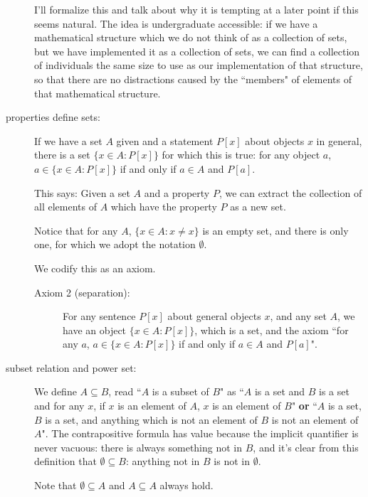 \documentclass[12pt]{article}
\begin{document}
\begin{description}
\begin{description}
\end{description}

I'll formalize this and talk about why it is tempting at a later point if this seems natural.  The idea is undergraduate accessible:  if we have a mathematical structure which we do not think of as a collection of sets, but we have implemented it as a collection of sets, we can find a collection of individuals the same size to use as our implementation of that structure, so that there are no distractions caused by the ``members" of elements of that mathematical structure.

\item[properties define sets:]  If we have a set $A$ given and a statement $P[x]$ about objects  $x$ in general, there is a set
$\{x \in A:P[x]\}$ for which this is true:  for any object $a$, $a \in \{x \in A:P[x]\}$ if and only if $a \in A$ and $P[a]$.

This says:  Given a set $A$ and a property $P$, we can extract the collection of all elements of $A$ which have the property $P$ as a new set.

Notice that for any $A$, $\{x \in A:x \neq x\}$ is an empty set, and there is only one, for which we adopt the notation $\emptyset$.

We codify this as an axiom.

\begin{description}

\item[Axiom 2 (separation):]  For any sentence $P[x]$ about general objects $x$, and any set $A$, we have
an object $\{x \in A:P[x]\}$, which is a set, and the axiom ``for any $a$, $a \in \{x \in A:P[x]\}$ if and only if $a \in A$ and $P[a]$".

\end{description}

\item[subset relation and power set:]  We define $A \subseteq B$, read ``$A$ is a subset of $B$" as  ``$A$ is a set and $B$ is a set and for any $x$, if $x$ is an element of $A$, $x$ is an element of $B$" {\bf or}  ``$A$ is a set, $B$ is a set, and anything which is not an element of $B$ is not an element of $A$".  The contrapositive formula has value because the implicit quantifier is never vacuous:  there is always something not in $B$, and it's clear from this definition that $\emptyset \subseteq B$:  anything not in $B$ is not in $\emptyset$.

Note that $\emptyset \subseteq A$ and $A \subseteq A$ always hold.


\end{description}
\end{document}
